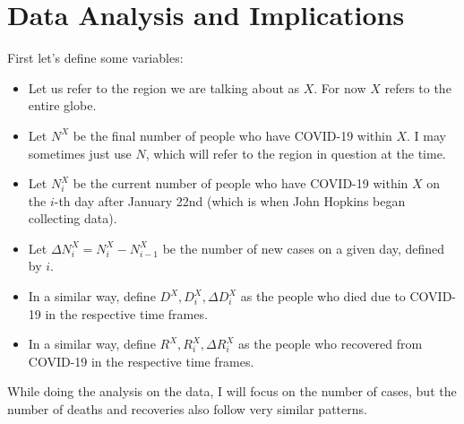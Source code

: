 \documentclass{report}
\begin{document}
    \section{Data Analysis and Implications}
        \indent First let's define some variables:
        \begin{itemize}
            \item Let us refer to the region we are talking about as $X$. For now $X$ refers to the entire globe.
            \item Let $N^X$ be the final number of people who have COVID-19 within $X$. I may sometimes just use $N$, which will refer to the region in question at the time.
            \item Let $N^X_i$ be the current number of people who have COVID-19 within $X$ on the $i$-th day after January 22nd (which is when John Hopkins began collecting data).
            \item Let $\Delta N^X_i = N^X_i - N^X_{i - 1}$ be the number of new cases on a given day, defined by $i$.
            \item In a similar way, define $D^X, D^X_i, \Delta D^X_i$ as the people who died due to COVID-19 in the respective time frames.
            \item In a similar way, define $R^X, R^X_i, \Delta R^X_i$ as the people who recovered from COVID-19 in the respective time frames.
        \end{itemize}
        While doing the analysis on the data, I will focus on the number of cases, but the number of deaths and recoveries also follow very similar patterns.
\end{document}
